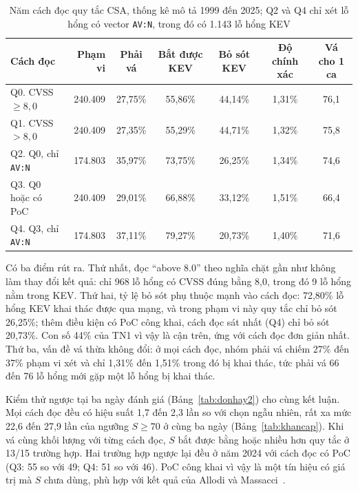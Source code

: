 \documentclass[conference]{IEEEtran}
\begin{document}
\begin{table}[t]
\caption{Năm cách đọc quy tắc CSA, thống kê mô tả 1999 đến 2025; Q2 và Q4 chỉ xét lỗ hổng có vector
\texttt{AV:N}, trong đó có 1.143 lỗ hổng KEV}\label{tab:donhay}
\centering
\begin{tabular}{lrccccc}
\toprule
Cách đọc & Phạm vi & Phải vá & Bắt được KEV & Bỏ sót KEV & Độ chính xác & Vá cho 1 ca \\
\midrule
Q0. CVSS $\ge 8{,}0$ & 240.409 & 27,75\% & 55,86\% & 44,14\% & 1,31\% & 76,1 \\
Q1. CVSS $> 8{,}0$ & 240.409 & 27,35\% & 55,29\% & 44,71\% & 1,32\% & 75,8 \\
Q2. Q0, chỉ \texttt{AV:N} & 174.803 & 35,97\% & 73,75\% & 26,25\% & 1,34\% & 74,6 \\
Q3. Q0 hoặc có PoC & 240.409 & 29,01\% & 66,88\% & 33,12\% & 1,51\% & 66,4 \\
Q4. Q3, chỉ \texttt{AV:N} & 174.803 & 37,11\% & 79,27\% & 20,73\% & 1,40\% & 71,6 \\
\bottomrule
\end{tabular}
\end{table}

Có ba điểm rút ra. Thứ nhất, đọc ``above 8.0'' theo nghĩa chặt gần như không làm thay đổi kết quả: chỉ 968
lỗ hổng có CVSS đúng bằng 8,0, trong đó 9 lỗ hổng nằm trong KEV. Thứ hai, tỷ lệ bỏ sót phụ thuộc
mạnh vào cách đọc: 72,80\% lỗ hổng KEV khai thác được qua mạng, và trong phạm vi này quy tắc chỉ bỏ
sót 26,25\%; thêm điều kiện có PoC công khai, cách đọc sát nhất (Q4) chỉ bỏ sót 20,73\%. Con số
44\% của TN1 vì vậy là cận trên, ứng với cách đọc đơn giản nhất. Thứ ba, vấn đề vá thừa không đổi:
ở mọi cách đọc, nhóm phải vá chiếm 27\% đến 37\% phạm vi xét và chỉ 1,31\% đến 1,51\% trong đó bị khai thác,
tức phải vá 66 đến 76 lỗ hổng mới gặp một lỗ hổng bị khai thác.

Kiểm thử ngược tại ba ngày đánh giá (Bảng~\ref{tab:donhay2}) cho cùng kết luận. Mọi cách đọc đều
có hiệu suất 1,7 đến 2,3 lần so với chọn ngẫu nhiên, rất xa mức 22,6 đến 27,9 lần của ngưỡng $S \ge 70$ ở cùng
ba ngày (Bảng~\ref{tab:khancap}). Khi vá cùng khối lượng với từng cách đọc, $S$ bắt được bằng hoặc
nhiều hơn quy tắc ở 13/15 trường hợp. Hai trường hợp ngược lại đều ở năm 2024 với cách đọc có PoC
(Q3: 55 so với 49; Q4: 51 so với 46). PoC công khai vì vậy là một tín hiệu có giá trị mà $S$ chưa
dùng, phù hợp với kết quả của Allodi và Massacci~\cite{allodi2014}.
\end{document}
